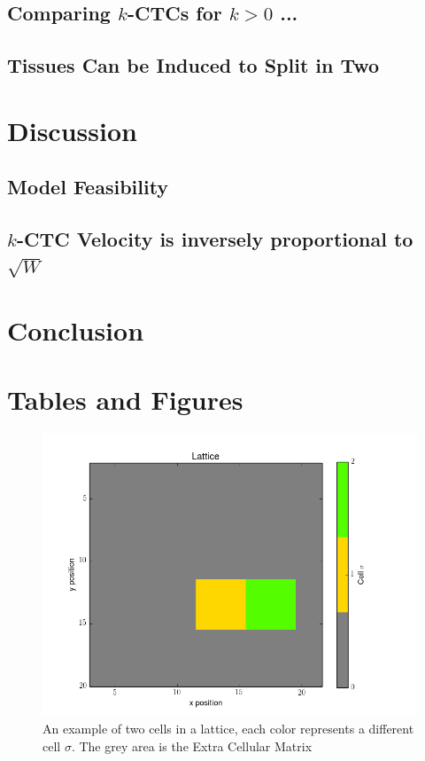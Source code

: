 \documentclass[12pt]{article}
\begin{document}
\subsection{Comparing $k$-CTCs for $k>0$ ...} %

\subsection{Tissues Can be Induced to Split in Two}

\section{Discussion}

\subsection{Model Feasibility}

\subsection{$k$-CTC Velocity is inversely proportional to $\sqrt{W}$ }

\section{Conclusion}


\pagebreak
\section{Tables and Figures}

\begin{figure}[h]
	\centering
	\includegraphics[scale=0.5]{img/basic}
	\caption{An example of two cells in a lattice, each color represents a different cell $\sigma$. The grey area is the Extra Cellular Matrix}
	\label{basic}
\end{figure}
\end{document}
